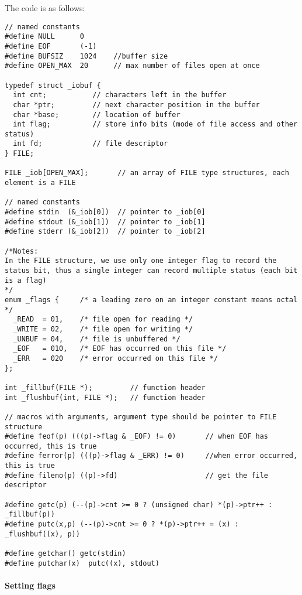 \documentclass[12pt]{article}
\begin{document}
The code is as follows:
\begin{verbatim}
// named constants
#define NULL      0
#define EOF       (-1)
#define BUFSIZ    1024    //buffer size
#define OPEN_MAX  20      // max number of files open at once

typedef struct _iobuf {
  int cnt;           // characters left in the buffer
  char *ptr;         // next character position in the buffer
  char *base;        // location of buffer 
  int flag;          // store info bits (mode of file access and other status)
  int fd;            // file descriptor
} FILE;

FILE _iob[OPEN_MAX];       // an array of FILE type structures, each element is a FILE

// named constants
#define stdin  (&_iob[0])  // pointer to _iob[0]
#define stdout (&_iob[1])  // pointer to _iob[1]
#define stderr (&_iob[2])  // pointer to _iob[2]

/*Notes: 
In the FILE structure, we use only one integer flag to record the status bit, thus a single integer can record multiple status (each bit is a flag)
*/
enum _flags {     /* a leading zero on an integer constant means octal */
  _READ  = 01,    /* file open for reading */
  _WRITE = 02,    /* file open for writing */
  _UNBUF = 04,    /* file is unbuffered */
  _EOF   = 010,   /* EOF has occurred on this file */
  _ERR   = 020    /* error occurred on this file */
};

int _fillbuf(FILE *);         // function header
int _flushbuf(int, FILE *);   // function header

// macros with arguments, argument type should be pointer to FILE structure
#define feof(p) (((p)->flag & _EOF) != 0)       // when EOF has occurred, this is true
#define ferror(p) (((p)->flag & _ERR) != 0)     //when error occurred, this is true
#define fileno(p) ((p)->fd)                     // get the file descriptor

#define getc(p) (--(p)->cnt >= 0 ? (unsigned char) *(p)->ptr++ : _fillbuf(p))
#define putc(x,p) (--(p)->cnt >= 0 ? *(p)->ptr++ = (x) : _flushbuf((x), p))

#define getchar() getc(stdin)
#define putchar(x)  putc((x), stdout)
\end{verbatim}


\paragraph{Setting flags}
\label{sec:org0f11971}
\end{document}
